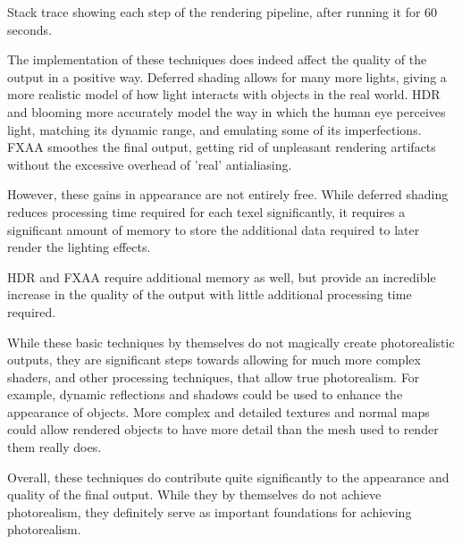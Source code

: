 \documentclass[11pt, oneside]{report}
\begin{document}
\begin{table}[!htbp]
	\caption{Stack trace showing each step of the rendering pipeline, after running it for 60 seconds.}
	\label{tab:booktabs}
\end{table}

The implementation of these techniques does indeed affect the quality of the output in a positive way. Deferred shading allows for many more lights, giving a more realistic model of how light interacts with objects in the real world. \gls{HDR} and blooming more accurately model the way in which the human eye perceives light, matching its dynamic range, and emulating some of its imperfections. FXAA smoothes the final output, getting rid of unpleasant rendering artifacts without the excessive overhead of 'real' antialiasing.

However, these gains in appearance are not entirely free. While deferred shading reduces processing time required for each \gls{texel} significantly, it requires a significant amount of memory to store the additional data required to later render the lighting effects.

HDR and FXAA require additional memory as well, but provide an incredible increase in the quality of the output with little additional processing time required.

While these basic techniques by themselves do not magically create photorealistic outputs, they are significant steps towards allowing for much more complex shaders, and other processing techniques, that allow true photorealism. For example, dynamic reflections and shadows could be used to enhance the appearance of objects. More complex and detailed textures and normal maps could allow rendered objects to have more detail than the mesh used to render them really does.

Overall, these techniques do contribute quite significantly to the appearance and quality of the final output. While they by themselves do not achieve photorealism, they definitely serve as important foundations for achieving photorealism.

\begingroup
	\printbibliography[
		heading=bibintoc,
		title={Bibliography}
	]
\endgroup

\printglossaries
\end{document}

